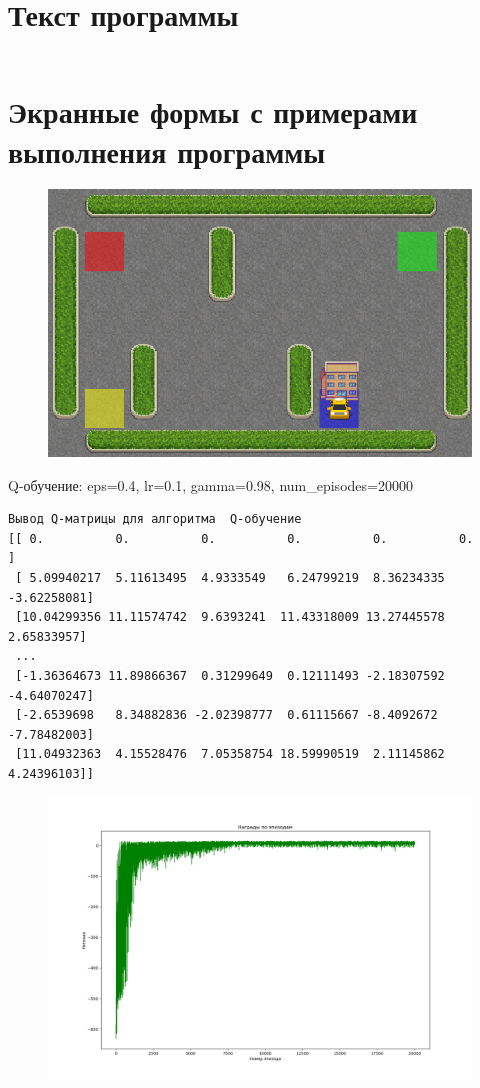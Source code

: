 \documentclass[a4paper]{article}
\begin{document}
  \section{Текст программы}
  \inputminted{python}{5.py}

  \section{Экранные формы с примерами выполнения программы}
  \begin{figure}[H]
    \includegraphics[scale=0.5]{52}
  \end{figure}
  \noindent Q-обучение: eps=0.4, lr=0.1, gamma=0.98, num\_episodes=20000
  \begin{verbatim}
Вывод Q-матрицы для алгоритма  Q-обучение
[[ 0.          0.          0.          0.          0.          0.        ]
 [ 5.09940217  5.11613495  4.9333549   6.24799219  8.36234335 -3.62258081]
 [10.04299356 11.11574742  9.6393241  11.43318009 13.27445578  2.65833957]
 ...
 [-1.36364673 11.89866367  0.31299649  0.12111493 -2.18307592 -4.64070247]
 [-2.6539698   8.34882836 -2.02398777  0.61115667 -8.4092672  -7.78482003]
 [11.04932363  4.15528476  7.05358754 18.59990519  2.11145862  4.24396103]]
  \end{verbatim}
  \begin{figure}[H]
    \includegraphics[scale=0.35]{51}
  \end{figure}
\end{document}
